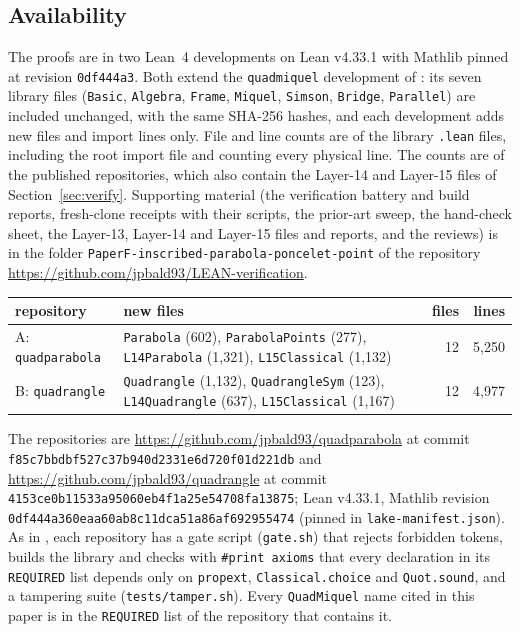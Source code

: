 \documentclass[11pt]{article}
\theoremstyle{definition}
\theoremstyle{remark}
\newcommand{\lean}[1]{\texttt{#1}}
\begin{document}
\subsection{Availability}\label{sec:avail}
The proofs are in two Lean~4 developments on Lean v4.33.1 with Mathlib pinned at revision
\texttt{0df444a3}. Both extend the \lean{quadmiquel} development of \cite{paperE}: its seven library
files (\lean{Basic}, \lean{Algebra}, \lean{Frame}, \lean{Miquel}, \lean{Simson}, \lean{Bridge},
\lean{Parallel}) are included unchanged, with the same SHA-256 hashes, and each development adds new
files and import lines only. File and line counts are of the library \lean{.lean} files, including the
root import file and counting every physical line. The counts are of the published repositories, which also contain the Layer-14 and Layer-15
files of Section~\ref{sec:verify}.
Supporting material (the verification battery and build reports, fresh-clone receipts with their scripts, the prior-art sweep, the hand-check sheet, the Layer-13, Layer-14 and Layer-15 files and reports, and the reviews) is in the folder \texttt{PaperF-inscribed-parabola-poncelet-point} of the repository \url{https://github.com/jpbald93/LEAN-verification}.
\begin{center}\small
\begin{tabular}{lp{7.2cm}rr}
\toprule
repository & new files & files & lines\\
\midrule
A: \lean{quadparabola} & \lean{Parabola} (602), \lean{ParabolaPoints} (277), \lean{L14Parabola} (1{,}321), \lean{L15Classical} (1{,}132) & 12 & 5{,}250\\
B: \lean{quadrangle} & \lean{Quadrangle} (1{,}132), \lean{QuadrangleSym} (123), \lean{L14Quadrangle} (637), \lean{L15Classical} (1{,}167) & 12 & 4{,}977\\
\bottomrule
\end{tabular}
\end{center}
The repositories are \url{https://github.com/jpbald93/quadparabola} at commit \texttt{f85c7bbdbf527c37b940d2331e6d720f01d221db} and \url{https://github.com/jpbald93/quadrangle} at commit \texttt{4153ce0b11533a95060eb4f1a25e54708fa13875};
Lean v4.33.1, Mathlib revision \texttt{0df444a360eaa60ab8c11dca51a86af692955474} (pinned in
\lean{lake-manifest.json}). As in \cite{paperE}, each repository has a gate script (\lean{gate.sh})
that rejects forbidden tokens, builds the library and checks with \lean{\#print axioms} that every
declaration in its \lean{REQUIRED} list depends only on \lean{propext}, \lean{Classical.choice} and
\lean{Quot.sound}, and a tampering suite (\lean{tests/tamper.sh}). Every \lean{QuadMiquel} name cited
in this paper is in the \lean{REQUIRED} list of the repository that contains it.
\end{document}
